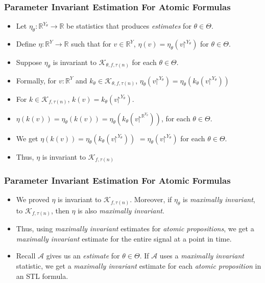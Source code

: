 \documentclass{beamer}
\renewcommand{\restriction}{\mathord{\upharpoonright}}
\newcommand{\typeReal}{\mathbb{R}}
\newcommand{\K}{\mathcal{K}}
\newcommand{\A}{\mathcal{A}}
\begin{document}
\begin{frame}
    \frametitle{Parameter Invariant Estimation For Atomic Formulas}
    \begin{itemize}
        \item Let $\eta_{\theta} : \typeReal^{Y_{\theta}} \to \typeReal$
            be statistics that produces \textit{estimates} for $\theta \in \Theta$.
        \item Define $\eta:\typeReal^{Y} \to \typeReal$ such
            that for $v \in \typeReal^{Y}$,
            $\eta(v) = \eta_{\theta}(v\restriction^{Y_{\theta}})$ for $\theta \in \Theta$.
        \item Suppose $\eta_{\theta}$ is invariant to $\K_{\theta, f, \tau(n)}$
            for each $\theta \in \Theta$.
        \item Formally, for $v : \typeReal^{Y}$ and
         $k_{\theta} \in \K_{\theta, f, \tau(n)}$,
            $\eta_{\theta}(v\restriction^{Y_{\theta}})
            = \eta_{\theta}(k_{\theta}(v\restriction^{Y_{\theta}}))$
        \item For $k \in \K_{f, \tau(n)}$, $k(v) =
            k_{\theta}(v\restriction^{Y_{\theta}})$.
        \item $\eta(k(v)) = \eta_{\theta}(k(v)) = \eta_{\theta}(k_{\theta}(v\restriction^{\typeReal^{Y_{\theta}}}))$,
            for each $\theta \in \Theta$.
        \item We get $\eta(k(v))
            = \eta_{\theta}(k_{\theta}(v \restriction^{Y_{\theta}}))$
            $=\eta_{\theta}(v\restriction^{Y_{\theta}})$ for each $\theta \in
            \Theta$.
        \item Thus, $\eta$ is invariant to $\K_{f, \tau(n)}$
    \end{itemize}
\end{frame}

\begin{frame}
    \frametitle{Parameter Invariant Estimation For Atomic Formulas}
    \begin{itemize}
        \item We proved $\eta$ is invariant to $\K_{f, \tau(n)}$. Moreover,
            if $\eta_{\theta}$ is \textit{maximally invariant},
            to $\K_{f, \tau(n)}$, then $\eta$ is also
            \textit{maximally invariant}.
        \item Thus, using \textit{maximally invariant} estimates
            for \textit{atomic propositions}, we get
            a \textit{maximally invariant} estimate for the
            entire signal at a point in time.
        \item Recall $\A$ gives us an \textit{estimate}
            for $\theta \in \Theta$. If $\A$ uses a
            \textit{maximally invariant} statistic, we
            get a \textit{maximally invariant} estimate for
            each \textit{atomic proposition} in an STL formula.
    \end{itemize}
\end{frame}
\end{document}
